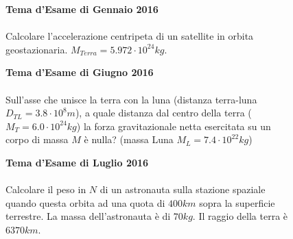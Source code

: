 \begin{figure}[h!]
\textbf{Tema d'Esame di Gennaio 2016}\\ \\
Calcolare l’accelerazione centripeta di un satellite in orbita geostazionaria.
$M_{Terra}=5.972\cdot 10^{24} kg$.
\end{figure}

\begin{figure}[h!]
\textbf{Tema d'Esame di Giugno 2016}\\ \\
Sull'asse che unisce la terra con la luna (distanza terra-luna $D_{TL}=3.8\cdot 10^8 m$), a quale distanza dal centro della terra ($M_T=6.0\cdot 10^{24} kg$) la forza gravitazionale netta esercitata su un corpo di massa $M$ è nulla? (massa Luna $M_L=7.4\cdot 10^{22} kg$)
\end{figure}

\begin{figure}[h!]
\textbf{Tema d'Esame di Luglio 2016}\\ \\
Calcolare il peso in $N$ di un astronauta sulla stazione spaziale quando questa orbita ad una quota di $400 km$ sopra la superficie terrestre. La massa dell'astronauta è di $70 kg$. Il raggio della terra è $6370 km$.
\end{figure}